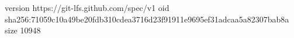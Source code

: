 version https://git-lfs.github.com/spec/v1
oid sha256:71059c10a49be20fdb310cdea3716d23f91911e9695ef31adcaa5a82307bab8a
size 10948
